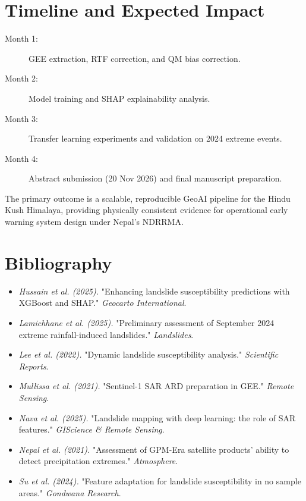 \documentclass[11pt,a4paper]{article}
\begin{document}
\section{Timeline and Expected Impact}
\begin{description}
    \item[Month 1:] GEE extraction, RTF correction, and QM bias correction.
    \item[Month 2:] Model training and SHAP explainability analysis.
    \item[Month 3:] Transfer learning experiments and validation on 2024 extreme events.
    \item[Month 4:] Abstract submission (20 Nov 2026) and final manuscript preparation.
\end{description}

The primary outcome is a scalable, reproducible GeoAI pipeline for the Hindu Kush Himalaya, providing physically consistent evidence for operational early warning system design under Nepal's NDRRMA.

\section{Bibliography}
\begin{itemize}[leftmargin=0.15in, label={}]
    \item \textit{Hussain et al. (2025).} "Enhancing landslide susceptibility predictions with XGBoost and SHAP." \textit{Geocarto International}.
    \item \textit{Lamichhane et al. (2025).} "Preliminary assessment of September 2024 extreme rainfall-induced landslides." \textit{Landslides}.
    \item \textit{Lee et al. (2022).} "Dynamic landslide susceptibility analysis." \textit{Scientific Reports}.
    \item \textit{Mullissa et al. (2021).} "Sentinel-1 SAR ARD preparation in GEE." \textit{Remote Sensing}.
    \item \textit{Nava et al. (2025).} "Landslide mapping with deep learning: the role of SAR features." \textit{GIScience \& Remote Sensing}.
    \item \textit{Nepal et al. (2021).} "Assessment of GPM-Era satellite products' ability to detect precipitation extremes." \textit{Atmosphere}.
    \item \textit{Su et al. (2024).} "Feature adaptation for landslide susceptibility in no sample areas." \textit{Gondwana Research}.
\end{itemize}
\end{document}
